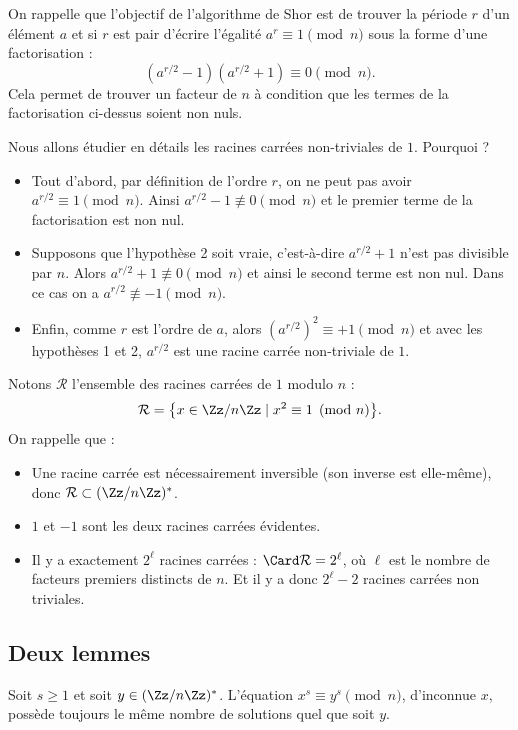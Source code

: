 \documentclass[11pt,class=report,crop=false]{standalone}
\begin{document}
On rappelle que l'objectif de l'algorithme de Shor est de trouver la période $r$ d'un élément $a$ et si $r$ est pair d'écrire l'égalité $a^r \equiv 1 \pmod n$ sous la forme d'une factorisation :
$$(a^{r/2}-1)(a^{r/2}+1) \equiv 0 \pmod n.$$
Cela permet de trouver un facteur de $n$ à condition que les termes de la factorisation ci-dessus soient non nuls.

Nous allons étudier en détails les racines carrées non-triviales de $1$.
Pourquoi ?
\begin{itemize}
  \item Tout d'abord, par définition de l'ordre $r$, on ne peut pas avoir $a^{r/2}\equiv 1 \pmod n$. Ainsi $a^{r/2}-1 \not\equiv 0 \pmod n$ et le premier terme de la factorisation est non nul.
  \item Supposons que l'hypothèse 2 soit vraie, c'est-à-dire $a^{r/2}+1$ n'est pas divisible par $n$. Alors $a^{r/2}+1 \not\equiv 0 \pmod n$ et ainsi le second terme est non nul. Dans ce cas on a $a^{r/2} \not\equiv -1 \pmod n$.
  \item Enfin, comme $r$ est l'ordre de $a$, alors $(a^{r/2})^2 \equiv +1 \pmod n$
et avec les hypothèses 1 et 2, $a^{r/2}$ est une racine carrée non-triviale de $1$.
\end{itemize}

\bigskip

Notons $\mathcal{R}$ l'ensemble des racines carrées de $1$ modulo $n$ :
$$\mathcal{R} = \big\{ x \in \Zz/n\Zz \mid x^2 \equiv 1 \pmod n \big\}.$$
On rappelle que :
\begin{itemize}
  \item Une racine carrée est nécessairement inversible (son inverse est elle-même), donc $\mathcal{R} \subset (\Zz/n\Zz)^*$.
  \item $1$ et $-1$ sont les deux racines carrées évidentes.
  \item Il y a exactement $2^\ell$ racines carrées : $\Card \mathcal{R} = 2^\ell$, où $\ell$ est le nombre de facteurs premiers distincts de $n$. Et il y a donc $2^\ell-2$ racines carrées non triviales.
\end{itemize}

\subsection{Deux lemmes}

\begin{lemme}
\label{lem:xs1}
Soit $s\ge1$ et soit $y\in(\Zz/n\Zz)^*$. L'équation $x^s \equiv y^s \pmod n$, d'inconnue $x$, possède toujours le même nombre de solutions quel que soit $y$. 
\end{lemme}
\end{document}
